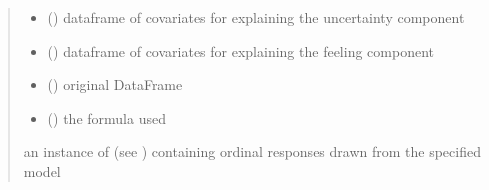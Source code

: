 \documentclass[letterpaper,10pt,english]{sphinxmanual}
\begin{document}
\begin{fulllineitems}
\begin{quote}
\begin{description}
\begin{itemize}
\item {} 
\sphinxAtStartPar
{} () \textendash{} dataframe of covariates for explaining the uncertainty component

\item {} 
\sphinxAtStartPar
{} () \textendash{} dataframe of covariates for explaining the feeling component

\item {} 
\sphinxAtStartPar
{} () \textendash{} original DataFrame

\item {} 
\sphinxAtStartPar
{} () \textendash{} the formula used

\end{itemize}

\sphinxAtStartPar
an instance of  (see ) containing ordinal responses drawn from the specified model

\end{description}\end{quote}

\end{fulllineitems}

\end{document}
